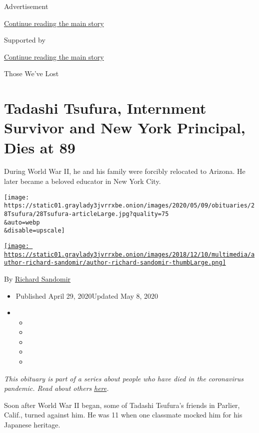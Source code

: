 Advertisement

\protect\hyperlink{after-top}{Continue reading the main story}

Supported by

\protect\hyperlink{after-sponsor}{Continue reading the main story}

Those We've Lost

\hypertarget{tadashi-tsufura-internment-survivor-and-new-york-principal-dies-at-89}{%
\section{Tadashi Tsufura, Internment Survivor and New York Principal,
Dies at
89}\label{tadashi-tsufura-internment-survivor-and-new-york-principal-dies-at-89}}

During World War II, he and his family were forcibly relocated to
Arizona. He later became a beloved educator in New York City.

\texttt{[image: https://static01.graylady3jvrrxbe.onion/images/2020/05/09/obituaries/28Tsufura/28Tsufura-articleLarge.jpg?quality=75\\\&auto=webp\\\&disable=upscale]}

\href{https://www.nytimes3xbfgragh.onion/by/richard-sandomir}{\texttt{[image: https://static01.graylady3jvrrxbe.onion/images/2018/12/10/multimedia/author-richard-sandomir/author-richard-sandomir-thumbLarge.png]}}

By \href{https://www.nytimes3xbfgragh.onion/by/richard-sandomir}{Richard
Sandomir}

\begin{itemize}
\item
  Published April 29, 2020Updated May 8, 2020
\item
  \begin{itemize}
  \item
  \item
  \item
  \item
  \item
  \end{itemize}
\end{itemize}

\emph{This obituary is part of a series about people who have died in
the coronavirus pandemic. Read about others}
\href{https://www.nytimes3xbfgragh.onion/series/people-who-have-died-of-the-coronavirus}{\emph{here}}\emph{.}

Soon after World War II began, some of Tadashi Tsufura's friends in
Parlier, Calif., turned against him. He was 11 when one classmate mocked
him for his Japanese heritage.

